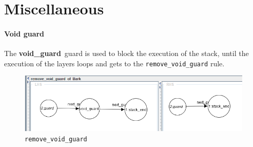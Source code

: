 \documentclass[a4paper, 10pt]{scrartcl}
\newcommand{\noderepr}[1]{\textsf{\textbf{#1}}}
\newcommand{\void}{\noderepr{void\_guard}}
\begin{document}
    \section{Miscellaneous}
    \paragraph*{Void guard} The \void\ guard is used to block the execution of the stack, until the execution of the layers loops and gets to the \texttt{remove\_void\_guard} rule.
    \begin{figure}[H]
        \centering
        \includegraphics[width=.8\linewidth]{images/remove_void_guard.png}
        \caption{\texttt{remove\_void\_guard}}
    \end{figure}
\end{document}
